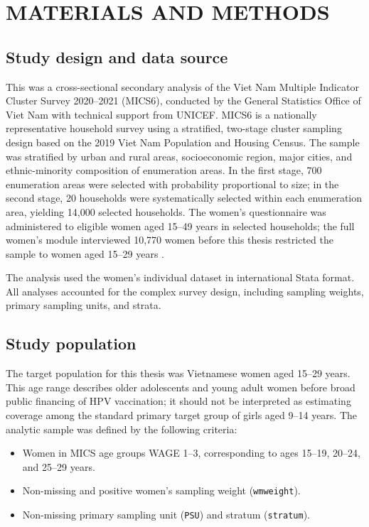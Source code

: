 \chapter{MATERIALS AND METHODS}

\section{Study design and data source}

This was a cross-sectional secondary analysis of the Viet Nam Multiple Indicator Cluster Survey 2020--2021 (MICS6), conducted by the General Statistics Office of Viet Nam with technical support from UNICEF. MICS6 is a nationally representative household survey using a stratified, two-stage cluster sampling design based on the 2019 Viet Nam Population and Housing Census. The sample was stratified by urban and rural areas, socioeconomic region, major cities, and ethnic-minority composition of enumeration areas. In the first stage, 700 enumeration areas were selected with probability proportional to size; in the second stage, 20 households were systematically selected within each enumeration area, yielding 14,000 selected households. The women's questionnaire was administered to eligible women aged 15--49 years in selected households; the full women's module interviewed 10,770 women before this thesis restricted the sample to women aged 15--29 years \cite{unicef2022}.

The analysis used the women's individual dataset in international Stata format. All analyses accounted for the complex survey design, including sampling weights, primary sampling units, and strata.

\section{Study population}

The target population for this thesis was Vietnamese women aged 15--29 years. This age range describes older adolescents and young adult women before broad public financing of HPV vaccination; it should not be interpreted as estimating coverage among the standard primary target group of girls aged 9--14 years. The analytic sample was defined by the following criteria:

\begin{itemize}
    \item Women in MICS age groups WAGE 1--3, corresponding to ages 15--19, 20--24, and 25--29 years.
    \item Non-missing and positive women's sampling weight (\texttt{wmweight}).
    \item Non-missing primary sampling unit (\texttt{PSU}) and stratum (\texttt{stratum}).
\end{itemize}

